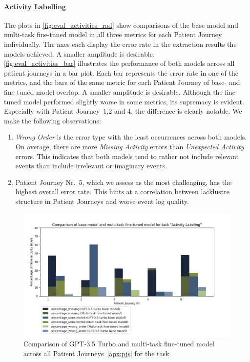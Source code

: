\paragraph{Activity Labelling} The plots in \autoref{fig:eval_activities_rad} show comparisons of the base model and multi-task fine-tuned model in all three metrics for each Patient Journey individually. The axes each display the error rate in the extraction results the models achieved. A smaller amplitude is desirable.\\
\autoref{fig:eval_activities_bar} illustrates the performance of both models across all patient journeys in a bar plot. Each bar represents the error rate in one of the metrics, and the bars of the same metric for each Patient Journey of base- and fine-tuned model overlap. A smaller amplitude is desirable. Although the fine-tuned model performed slightly worse in some metrics, its supremacy is evident. Especially with Patient Journey~1,2 and 4, the difference is clearly notable. We make the following observations:
\begin{enumerate}
    \item \emph{Wrong Order} is the error type with the least occurrences across both models. On average, there are more \emph{Missing Activity} errors than \emph{Unexpected Activity} errors. This indicates that both models tend to rather not include relevant events than include irrelevant or imaginary events.
    \item Patient Journey Nr.~5, which we assess as the most challenging, has the highest overall error rate. This hints at a correlation between lacklustre structure in Patient Journeys and worse event log quality.
\end{enumerate}

\begin{figure}[!htb]
    \centering
    \captionsetup{belowskip=0pt,aboveskip=0pt}
    \includegraphics[width=\textwidth]{bachelor_thesis/images/activities_all.png}
    \caption{Comparison of GPT-3.5 Turbo and multi-task fine-tuned model across all Patient Journeys~\ref{apx:pjs} for the task } 
    \label{fig:eval_activities_bar}
\end{figure}

